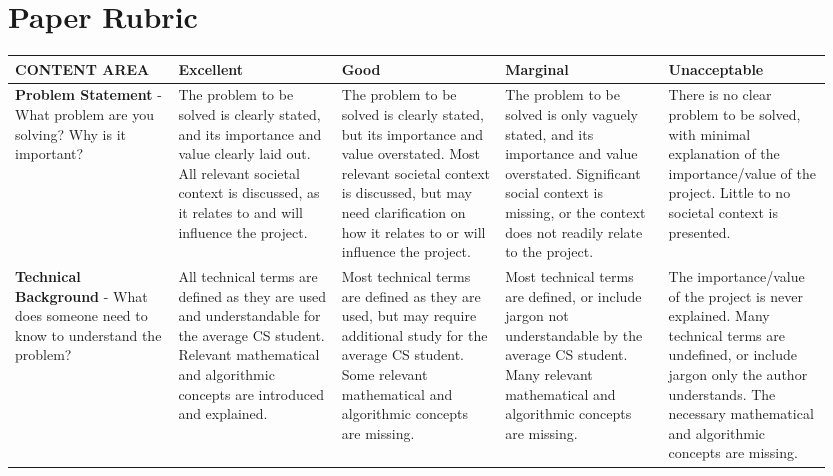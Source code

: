 \documentclass[10pt,twocolumn]{article}
\begin{document}
\appendix

\clearpage

\onecolumn

\section{Paper Rubric}
\begin{landscape}\small
\begin{longtable}{p{0.19\linewidth} | p{0.19\linewidth} | p{0.19\linewidth} | p{0.19\linewidth} | p{0.19\linewidth}}
\textbf{CONTENT AREA}
    & \textbf{Excellent}
    & \textbf{Good}
    & \textbf{Marginal}
    & \textbf{Unacceptable} \\
\toprule \endhead
\textbf{Problem Statement} - What problem are you solving? Why is it important?
    & \cellcolor{excellent} The problem to be solved is clearly stated, and its importance and value clearly laid out. All relevant societal context is discussed, as it relates to and will influence the project.
    & \cellcolor{good} The problem to be solved is clearly stated, but its importance and value overstated. Most relevant societal context is discussed, but may need clarification on how it relates to or will influence the project.
    & \cellcolor{marginal} The problem to be solved is only vaguely stated, and its importance and value overstated. Significant social context is missing, or the context does not readily relate to the project.
    & \cellcolor{unacceptable} There is no clear problem to be solved, with minimal explanation of the importance/value of the project. Little to no societal context is presented. \\
\midrule
\textbf{Technical Background} - What does someone need to know to understand the problem?
    & \cellcolor{excellent} All technical terms are defined as they are used and understandable for the average CS student. Relevant mathematical and algorithmic concepts are introduced and explained.
    & \cellcolor{good} Most technical terms are defined as they are used, but may require additional study for the average CS student. Some relevant mathematical and algorithmic concepts are missing.
    & \cellcolor{marginal} Most technical terms are defined, or include jargon not understandable by the average CS student. Many relevant mathematical and algorithmic concepts are missing.
    & \cellcolor{unacceptable} The importance/value of the project is never explained. Many technical terms are undefined, or include jargon only the author understands. The necessary mathematical and algorithmic concepts are missing. \\

\end{longtable}
\end{landscape}
\end{document}
